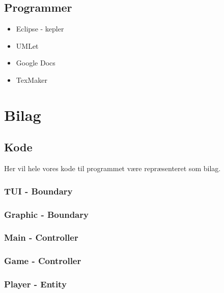 \documentclass{article}
\begin{document}
\subsection{Programmer}
\begin{itemize}
\item Eclipse - kepler
\item UMLet
\item Google Docs
\item TexMaker
\end{itemize}
\newpage
\section{Bilag}
\subsection{Kode}
Her vil hele vores kode til programmet være repræsenteret som bilag.
\subsubsection{TUI - Boundary}

\subsubsection{Graphic - Boundary}

\subsubsection{Main - Controller}

\subsubsection{Game - Controller}

\subsubsection{Player - Entity}

\end{document}
